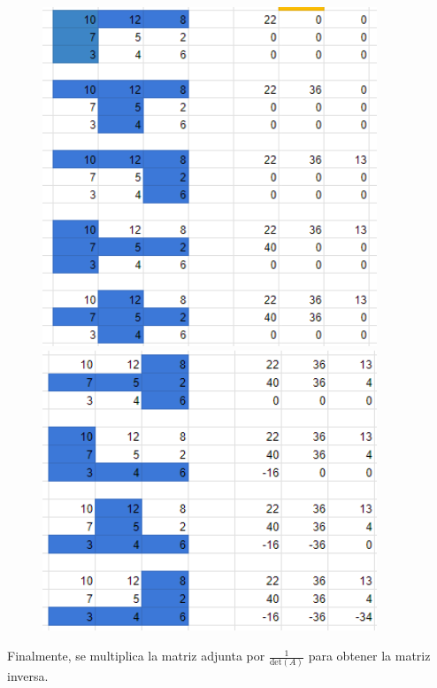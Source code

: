\documentclass[]{article}
\begin{document}
		
	\begin{figure}[!ht]
		\centering
		\includegraphics[width=10cm]{adjunta1.png}
		\includegraphics[width=10cm]{adjunta2.png}
	\end{figure}
	Finalmente, se multiplica la matriz adjunta por \(\frac{1}{\text{det}(A)}\) para obtener la matriz inversa.
	
\end{document}
